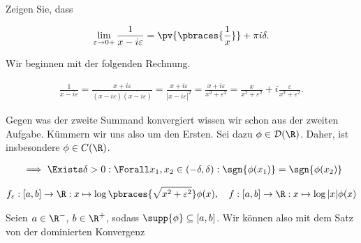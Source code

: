 
\begin{exercise}

Zeigen Sie, dass

\begin{align*}
    \lim_{\varepsilon \to 0+}
    \frac{1}{x - i \varepsilon}
    =
    \pv
    {
        \pbraces
        {
            \frac{1}{x}
        }
    }
    +
    \pi i \delta.
\end{align*}

\end{exercise}


\begin{solution}

Wir beginnen mit der folgenden Rechnung.

\begin{align*}
    \frac{1}{x - i\varepsilon}
    =
    \frac
    {
        x + i \varepsilon
    }{
        (x - i\varepsilon)
        \overline
        {
            (x - i\varepsilon)
        }
    }
    =
    \frac
    {
        x + i \varepsilon
    }{
        |x - i \varepsilon|^2
    }
    =
    \frac{x + i \varepsilon}{x^2 + \varepsilon^2}
    =
    \frac{x}{x^2 + \varepsilon^2} + i\frac{\varepsilon}{x^2 + \varepsilon^2}.
\end{align*}

Gegen was der zweite Summand konvergiert wissen wir schon aus der zweiten Aufgabe.
Kümmern wir uns also um den Ersten.
Sei dazu $\phi \in \mathcal{D}(\R)$.
Daher, ist insbesondere $\phi \in C(\R)$.

\begin{align*}
    & \implies
    \Exists \delta > 0:
    \Forall x_1, x_2 \in (-\delta, \delta):
    \sgn{\phi(x_1)} = \sgn{\phi(x_2)} \\
\end{align*}

\begin{align*}
    f_\varepsilon:
    [a,b] \to \R:
    x \mapsto \log\pbraces{\sqrt{x^2 + \varepsilon^2}} \phi(x),
    \quad
    f:
    [a,b] \to \R:
    x \mapsto \log{|x|} \phi(x)
\end{align*}

Seien $a \in \R^-$, $b \in \R^+$, sodass $\supp{\phi} \subseteq [a, b]$.
Wir können also mit dem Satz von der dominierten Konvergenz


\end{solution}
